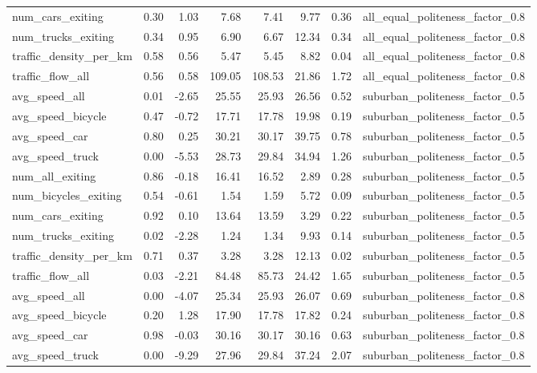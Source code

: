 \begin{table}[ht]
\begin{tabular}{lrrrrrrl}
  num\_cars\_exiting & 0.30 & 1.03 & 7.68 & 7.41 & 9.77 & 0.36 & all\_equal\_politeness\_factor\_0.8 \\ 
  num\_trucks\_exiting & 0.34 & 0.95 & 6.90 & 6.67 & 12.34 & 0.34 & all\_equal\_politeness\_factor\_0.8 \\ 
  traffic\_density\_per\_km & 0.58 & 0.56 & 5.47 & 5.45 & 8.82 & 0.04 & all\_equal\_politeness\_factor\_0.8 \\ 
  traffic\_flow\_all & 0.56 & 0.58 & 109.05 & 108.53 & 21.86 & 1.72 & all\_equal\_politeness\_factor\_0.8 \\ 
  avg\_speed\_all & 0.01 & -2.65 & 25.55 & 25.93 & 26.56 & 0.52 & suburban\_politeness\_factor\_0.5 \\ 
  avg\_speed\_bicycle & 0.47 & -0.72 & 17.71 & 17.78 & 19.98 & 0.19 & suburban\_politeness\_factor\_0.5 \\ 
  avg\_speed\_car & 0.80 & 0.25 & 30.21 & 30.17 & 39.75 & 0.78 & suburban\_politeness\_factor\_0.5 \\ 
  avg\_speed\_truck & 0.00 & -5.53 & 28.73 & 29.84 & 34.94 & 1.26 & suburban\_politeness\_factor\_0.5 \\ 
  num\_all\_exiting & 0.86 & -0.18 & 16.41 & 16.52 & 2.89 & 0.28 & suburban\_politeness\_factor\_0.5 \\ 
  num\_bicycles\_exiting & 0.54 & -0.61 & 1.54 & 1.59 & 5.72 & 0.09 & suburban\_politeness\_factor\_0.5 \\ 
  num\_cars\_exiting & 0.92 & 0.10 & 13.64 & 13.59 & 3.29 & 0.22 & suburban\_politeness\_factor\_0.5 \\ 
  num\_trucks\_exiting & 0.02 & -2.28 & 1.24 & 1.34 & 9.93 & 0.14 & suburban\_politeness\_factor\_0.5 \\ 
  traffic\_density\_per\_km & 0.71 & 0.37 & 3.28 & 3.28 & 12.13 & 0.02 & suburban\_politeness\_factor\_0.5 \\ 
  traffic\_flow\_all & 0.03 & -2.21 & 84.48 & 85.73 & 24.42 & 1.65 & suburban\_politeness\_factor\_0.5 \\ 
  avg\_speed\_all & 0.00 & -4.07 & 25.34 & 25.93 & 26.07 & 0.69 & suburban\_politeness\_factor\_0.8 \\ 
  avg\_speed\_bicycle & 0.20 & 1.28 & 17.90 & 17.78 & 17.82 & 0.24 & suburban\_politeness\_factor\_0.8 \\ 
  avg\_speed\_car & 0.98 & -0.03 & 30.16 & 30.17 & 30.16 & 0.63 & suburban\_politeness\_factor\_0.8 \\ 
  avg\_speed\_truck & 0.00 & -9.29 & 27.96 & 29.84 & 37.24 & 2.07 & suburban\_politeness\_factor\_0.8 \\ 

\end{tabular}
\end{table}
